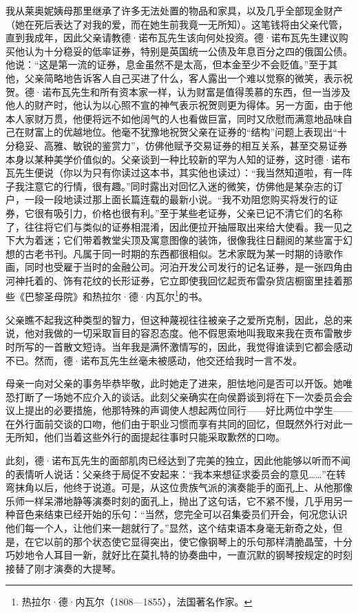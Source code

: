\par 我从莱奥妮姨母那里继承了许多无法处置的物品和家具，以及几乎全部现金财产（她在死后表达了对我的爱，而在她生前我竟一无所知）。这笔钱将由父亲代管，直到我成年，因此父亲请教德·诺布瓦先生该向何处投资。德·诺布瓦先生建议购买他认为十分稳妥的低率证券，特别是英国统一公债及年息百分之四的俄国公债。他说：“这是第一流的证券，息金虽然不是太高，但本金至少不会贬值。”至于其他，父亲简略地告诉客人自己买进了什么，客人露出一个难以觉察的微笑，表示祝贺。德·诺布瓦先生和所有资本家一样，认为财富是值得羡慕的东西，但一当涉及他人的财产时，他认为以心照不宣的神气表示祝贺则更为得体。另一方面，由于他本人家财万贯，他便将远不如他阔气的人也看做巨富，同时又欣慰而满意地品味自己在财富上的优越地位。他毫不犹豫地祝贺父亲在证券的“结构”问题上表现出“十分稳妥、高雅、敏锐的鉴赏力”，仿佛他赋予交易证券的相互关系，甚至交易证券本身以某种美学价值似的。父亲谈到一种比较新的罕为人知的证券，这时德·诺布瓦先生便说（你以为只有你读过这本书，其实他也读过）：“我当然知道啦，有一阵子我注意它的行情，很有趣。”同时露出对回忆入迷的微笑，仿佛他是某杂志的订户，一段一段地读过那上面长篇连载的最新小说。“我不劝阻您购买将发行的证券，它很有吸引力，价格也很有利。”至于某些老证券，父亲已记不清它们的名称了，往往将它们与类似的证券相混淆，因此便拉开抽屉取出来给大使看。我一见之下大为着迷；它们带着教堂尖顶及寓意图像的装饰，很像我往日翻阅的某些富于幻想的古老书刊。凡属于同一时期的东西都很相似。艺术家既为某一时期的诗歌作画，同时也受雇于当时的金融公司。河泊开发公司发行的记名证券，是一张四角由河神托着的、饰有花纹的长形证券，它立即使我回忆起贡布雷杂货店橱窗里挂着那些《巴黎圣母院》和热拉尔·德·内瓦尔\footnote{热拉尔·德·内瓦尔（1808—1855），法国著名作家。}的书。
\par 父亲瞧不起我这种类型的智力，但这种蔑视往往被亲子之爱所克制，因此，总的来说，他对我做的一切采取盲目的容忍态度。他不假思索地叫我取来我在贡布雷散步时所写的一首散文短诗。当年我是满怀激情写的，因此，我觉得谁读到它都会感动不已。然而，德·诺布瓦先生丝毫未被感动，他交还给我时一言不发。
\par 母亲一向对父亲的事务毕恭毕敬，此时她走了进来，胆怯地问是否可以开饭。她唯恐打断了一场她不应介入的谈话。此刻父亲确实在向侯爵谈到将在下一次委员会会议上提出的必要措施，他那特殊的声调使人想起两位同行——好比两位中学生——在外行面前交谈的口吻，他们由于职业习惯而享有共同的回忆，但既然外行对此一无所知，他们当着这些外行的面提起往事时只能采取歉然的口吻。
\par 此刻，德·诺布瓦先生的面部肌肉已经达到了完美的独立，因此他能够以听而不闻的表情听人说话：父亲终于局促不安起来：“我本来想征求委员会的意见……”在转弯抹角以后，他终于说道。可是，从这位贵族气派的演奏能手的面孔上、从他那像乐师一样呆滞地静等演奏时刻的面孔上，抛出了这句话，它不紧不慢，几乎用另一种音色来结束已经开始的乐句：“当然，您完全可以召集委员们开会，何况您认识他们每一个人，让他们来一趟就行了。”显然，这个结束语本身毫无新奇之处，但是，在它以前的那个状态使它显得突出，使它像钢琴上的乐句那样清脆晶莹，十分巧妙地令人耳目一新，就好比在莫扎特的协奏曲中，一直沉默的钢琴按规定的时刻接替了刚才演奏的大提琴。

